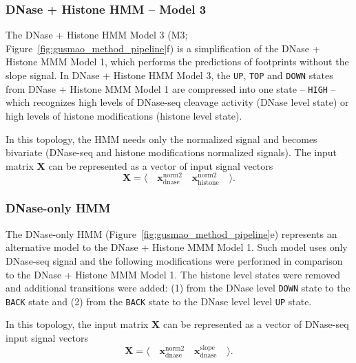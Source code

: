 \subsubsection{DNase + Histone HMM -- Model 3}

The DNase + Histone HMM Model 3 (M3; Figure~\ref{fig:gusmao_method_pipeline}f) is a simplification of the DNase + Histone MMM Model 1, which performs the predictions of footprints without the slope signal. In DNase + Histone HMM Model 3, the {\tt UP}, {\tt TOP} and {\tt DOWN} states from DNase + Histone MMM Model 1 are compressed into one state -- {\tt HIGH} -- which recognizes high levels of DNase-seq cleavage activity (DNase level state) or high levels of histone modifications (histone level state).

In this topology, the HMM needs only the normalized signal and becomes bivariate (DNase-seq and histone modifications normalized signals). The input matrix $\mathbf{X}$ can be represented as a vector of input signal vectors
\begin{equation}
  \label{eq:signal.m3}
  \mathbf{X} = \langle \quad \mathbf{x}^{\text{norm2}}_{\text{dnase}} \quad \mathbf{x}^{\text{norm2}}_{\text{histone}} \quad \rangle .
\end{equation}

\subsubsection{DNase-only HMM}

The DNase-only HMM (Figure~\ref{fig:gusmao_method_pipeline}e) represents an alternative model to the DNase + Histone MMM Model 1. Such model uses only DNase-seq signal and the following modifications were performed in comparison to the DNase + Histone MMM Model 1. The histone level states were removed and additional transitions were added: (1) from the DNase level {\tt DOWN} state to the {\tt BACK} state and (2) from the {\tt BACK} state to the DNase level level {\tt UP} state.

In this topology, the input matrix $\mathbf{X}$ can be represented as a vector of DNase-seq input signal vectors
\begin{equation}
  \label{eq:signal.m4}
  \mathbf{X} = \langle \quad \mathbf{x}^{\text{norm2}}_{\text{dnase}} \quad \mathbf{x}^{\text{slope}}_{\text{dnase}} \quad \rangle .
\end{equation}

